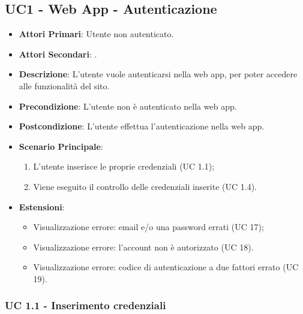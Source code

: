 	\subsection{UC1 - Web App - Autenticazione}
		
		
	\begin{itemize}
		\item \textbf{Attori Primari}: Utente non autenticato.
		\item \textbf{Attori Secondari}: .
		\item \textbf{Descrizione}: L'utente vuole autenticarsi nella web app, per poter accedere alle funzionalità del sito.
		\item \textbf{Precondizione}: L'utente non è autenticato nella web app.
		\item \textbf{Postcondizione}: L'utente effettua l'autenticazione nella web app.
		\item \textbf{Scenario Principale}:
		\begin{enumerate}
			\item L'utente inserisce le proprie credenziali (UC 1.1);
			\item Viene eseguito il controllo delle credenziali inserite (UC 1.4).
		\end{enumerate}
		\item \textbf{Estensioni}:
			\begin{itemize}
				\item Visualizzazione errore: email e/o una password errati (UC 17);
				\item Visualizzazione errore: l'account non è autorizzato (UC 18).
				\item Visualizzazione errore: codice di autenticazione a due fattori errato (UC 19).
			\end{itemize}
	\end{itemize}
	

		\subsubsection{UC 1.1 - Inserimento credenziali}

